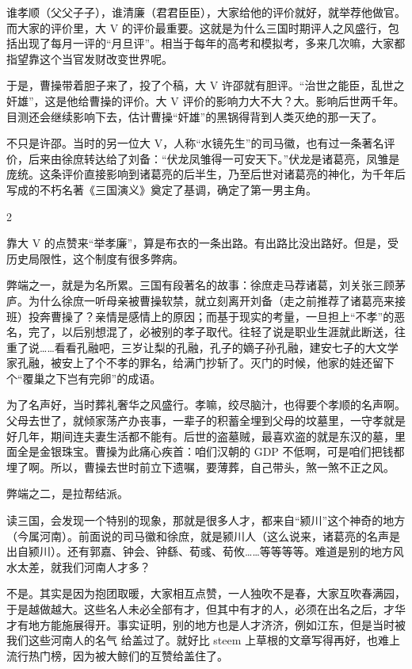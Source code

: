 \documentclass[]{ctexbook}
\begin{document}
谁孝顺（父父子子），谁清廉（君君臣臣），大家给他的评价就好，就举荐他做官。而大家的评价里，大 V 的评价最重要。这就是为什么三国时期评人之风盛行，包括出现了每月一评的``月旦评''。相当于每年的高考和模拟考，多来几次嘛，大家都指望靠这个当官发财改变世界呢。

于是，曹操带着胆子来了，投了个稿，大 V 许邵就有胆评。``治世之能臣，乱世之奸雄''，这是他给曹操的评价。大 V 评价的影响力大不大？大。影响后世两千年。目测还会继续影响下去，估计曹操``奸雄''的黑锅得背到人类灭绝的那一天了。

不只是许邵。当时的另一位大 V，人称``水镜先生''的司马徽，也有过一条著名评价，后来由徐庶转达给了刘备：``伏龙凤雏得一可安天下。''伏龙是诸葛亮，凤雏是庞统。这条评价直接影响到诸葛亮的后半生，乃至后世对诸葛亮的神化，为千年后写成的不朽名著《三国演义》奠定了基调，确定了第一男主角。

2

靠大 V 的点赞来``举孝廉''，算是布衣的一条出路。有出路比没出路好。但是，受历史局限性，这个制度有很多弊病。

弊端之一，就是为名所累。三国有段著名的故事：徐庶走马荐诸葛，刘关张三顾茅庐。为什么徐庶一听母亲被曹操软禁，就立刻离开刘备（走之前推荐了诸葛亮来接班）投奔曹操了？亲情是感情上的原因；而基于现实的考量，一旦担上``不孝''的恶名，完了，以后别想混了，必被别的孝子取代。往轻了说是职业生涯就此断送，往重了说\ldots{}\ldots{}看看孔融吧，三岁让梨的孔融，孔子的嫡子孙孔融，建安七子的大文学家孔融，被安上了个不孝的罪名，给满门抄斩了。灭门的时候，他家的娃还留下个``覆巢之下岂有完卵''的成语。

为了名声好，当时葬礼奢华之风盛行。孝嘛，绞尽脑汁，也得要个孝顺的名声啊。父母去世了，就倾家荡产办丧事，一辈子的积蓄全埋到父母的坟墓里，一守孝就是好几年，期间连夫妻生活都不能有。后世的盗墓贼，最喜欢盗的就是东汉的墓，里面全是金银珠宝。曹操为此痛心疾首：咱们汉朝的 GDP 不低啊，可是咱们把钱都埋了啊。所以，曹操去世时前立下遗嘱，要薄葬，自己带头，煞一煞不正之风。

弊端之二，是拉帮结派。

读三国，会发现一个特别的现象，那就是很多人才，都来自``颍川''这个神奇的地方（今属河南）。前面说的司马徽和徐庶，就是颍川人（这么说来，诸葛亮的名声是出自颍川）。还有郭嘉、钟会、钟繇、荀彧、荀攸\ldots{}\ldots{}等等等等。难道是别的地方风水太差，就我们河南人才多？

不是。其实是因为抱团取暖，大家相互点赞，一人独吹不是春，大家互吹春满园，于是越做越大。这些名人未必全部有才，但其中有才的人，必须在出名之后，才华才有地方能施展得开。事实证明，别的地方也是人才济济，例如江东，但是当时被我们这些河南人的名气 给盖过了。就好比 steem 上草根的文章写得再好，也难上流行热门榜，因为被大鲸们的互赞给盖住了。
\end{document}
